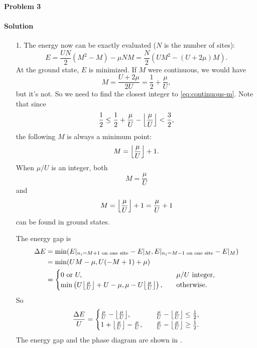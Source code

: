 \documentclass[hyperref, a4paper]{article}
\DeclarePairedDelimiter\floor{\lfloor}{\rfloor}
\begin{document}
\paragraph{Problem 3}

\paragraph{Solution} \begin{itemize}
\item[1.] The energy now can be exactly evaluated ($N$ is the number of sites):
\begin{equation}
    E = \frac{U N}{2} (M^2 - M) - \mu NM
    = \frac{N}{2} (U M^2 - (U + 2\mu) M).
\end{equation}
At the ground state, $E$ is minimized.
If $M$ were continuous, we would have
\begin{equation}
    M = \frac{U + 2\mu}{2 U} = \frac{1}{2} + \frac{\mu}{U}, 
    \label{eq:continuous-m}
\end{equation}
but it's not. So we need to find the closest integer to \eqref{eq:continuous-m}.
Note that since
\[
    \frac{1}{2} \leq \frac{1}{2} + \frac{\mu}{U} - \floor*{\frac{\mu}{U}} < \frac{3}{2},
\]
the following $M$ is always a minimum point:
\begin{equation}
    M = \floor*{\frac{\mu}{U}} + 1.
\end{equation}
When $\mu / U$ is an integer, both 
\begin{equation}
    M = \frac{\mu}{U} 
\end{equation}
and 
\begin{equation}
    M = \floor*{\frac{\mu}{U}} + 1 = \frac{\mu}{U} + 1
\end{equation}
can be found in ground states.

The energy gap is 
\begin{equation}
    \begin{aligned}
        \Delta E &= \min( E|_{n_i = M+1 \text{ on one site}} - E|_M, E|_{n_i = M-1 \text{ on one site}} - E|_M ) \\
        &= \min( UM - \mu, U(- M + 1) + \mu ) \\
        &= \begin{cases}
            0 \text{ or } U, \quad &\text{$\mu / U$ integer}, \\
            \min\left( 
                U \floor*{\frac{\mu}{U}} + U - \mu,
                \mu - U \floor*{\frac{\mu}{U}} \right),\quad &\text{otherwise}.
        \end{cases}
    \end{aligned}
\end{equation}
So
\begin{equation}
    \frac{\Delta E}{U} 
    = \begin{cases}
        \frac{\mu}{U} - \floor*{\frac{\mu}{U}} , &\quad \frac{\mu}{U} - \floor*{\frac{\mu}{U}} \leq \frac{1}{2} , \\
        1 + \floor*{\frac{\mu}{U}} - \frac{\mu}{U} , &\quad \frac{\mu}{U} - \floor*{\frac{\mu}{U}} \geq \frac{1}{2}. 
    \end{cases}
\end{equation}
The energy gap and the phase diagram are shown in .


\end{itemize}
\end{document}
